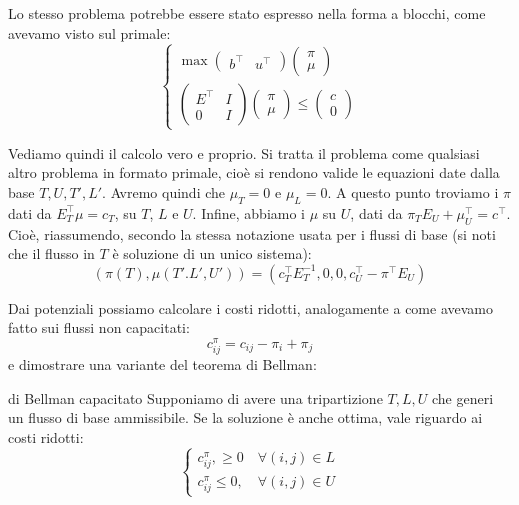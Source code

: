 \documentclass[a4paper,11pt]{article}
\begin{document}
Lo stesso problema potrebbe essere stato espresso nella forma a blocchi, come avevamo visto sul primale:
\[
	\begin{cases}
		\max 
		\begin{pmatrix}
			b^\intercal & u^\intercal
		\end{pmatrix}
		\begin{pmatrix}
			\pi \\ \mu
		\end{pmatrix}\\
		\begin{pmatrix}
			E^\intercal & I \\ 
			0 & I
		\end{pmatrix}
		\begin{pmatrix}
			\pi \\ \mu
		\end{pmatrix}
			\leq
		\begin{pmatrix}
			c \\ 0
		\end{pmatrix}
	\end{cases}
\]

Vediamo quindi il calcolo vero e proprio.
Si tratta il problema come qualsiasi altro problema in formato primale, cioè si rendono valide le equazioni date dalla base $T, U, T', L'$.
Avremo quindi che $\mu_T = 0$ e $\mu_L = 0$.
A questo punto troviamo i $\pi$ dati da $E_T^\intercal \mu = c_T$, su $T$, $L$ e $U$.
Infine, abbiamo i $\mu$ su $U$, dati da $\pi_T E_U + \mu_U^\intercal = c^\intercal$.
Cioè, riassumendo, secondo la stessa notazione usata per i flussi di base (si noti che il flusso in $T$ è soluzione di un unico sistema):
$$
(\pi(T), \mu(T'. L', U')) = \left(c_T^\intercal E_T^{-1}, 0, 0, c_U^\intercal - \pi^\intercal E_U \right)
$$

Dai potenziali possiamo calcolare i costi ridotti, analogamente a come avevamo fatto sui flussi non capacitati:
$$
c^\pi_{ij} = c_{ij} - \pi_i + \pi_j
$$
e dimostrare una variante del teorema di Bellman:

\begin{theorem}{di Bellman capacitato}
	Supponiamo di avere una tripartizione $T, L, U$ che generi un flusso di base ammissibile.
	Se la soluzione è anche ottima, vale riguardo ai costi ridotti:
	\[
		\begin{cases}
			c_ {ij}^\pi, \geq 0 \quad \forall (i,j) \in L \\ 
			c_ {ij}^\pi \leq 0, \quad \forall (i,j) \in U
		\end{cases}
	\]	
\end{theorem}
\end{document}
